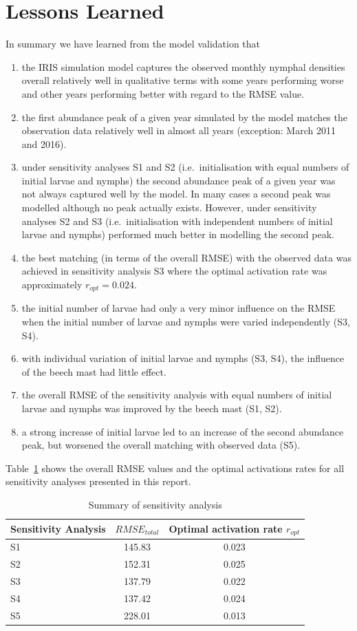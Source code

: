 \documentclass[a4paper, 11pt]{scrartcl}
\begin{document}
\section{Lessons Learned}
In summary we have learned from the model validation that

\begin{enumerate}
\item the IRIS simulation model captures the observed monthly nymphal densities overall relatively well in qualitative terms with some years performing worse and other years performing better with regard to the RMSE value.
\item the first abundance peak of a given year simulated by the model matches the observation data relatively well in almost all years (exception: March 2011 and 2016).
\item under sensitivity analyses S1 and S2 (i.e.\ initialisation with equal numbers of initial larvae and nymphs) the second abundance peak of a given year was not always captured well by the model. In many cases a second peak was modelled although no peak actually exists. However, under sensitivity analyses S2 and S3 (i.e.\ initialisation with independent numbers of initial larvae and nymphs) performed much better in modelling the second peak.
\item the best matching (in terms of the overall RMSE) with the observed data was achieved in sensitivity analysis S3 where the optimal activation rate was approximately $r_{opt} = 0.024$.
\item the initial number of larvae had only a very minor influence on the RMSE when the initial number of larvae and nymphs were varied independently (S3, S4).
\item with individual variation of initial larvae and nymphs (S3, S4), the influence of the beech mast had little effect.
\item the overall RMSE of the sensitivity analysis with equal numbers of initial larvae and nymphs was improved by the beech mast (S1, S2).
\item a strong increase of initial larvae led to an increase of the second abundance peak, but worsened the overall matching with observed data (S5).
\end{enumerate}

Table~\ref{tab:summary} shows the overall RMSE values and the optimal activations rates for all sensitivity analyses presented in this report.

\begin{table}[h!]
\caption{Summary of sensitivity analysis}
\label{tab:summary}
\begin{tabularx}{\textwidth}{lcc}
\toprule
\textbf{Sensitivity Analysis} & \textbf{$RMSE_{total}$} & \textbf{Optimal activation rate $r_{opt}$} \\
\midrule
S1 & 145.83 & 0.023 \\
S2 & 152.31 & 0.025 \\
S3 & 137.79 & 0.022 \\
S4 & 137.42 & 0.024 \\
S5 & 228.01 & 0.013 \\
\bottomrule
\end{tabularx}
\end{table}
\end{document}
